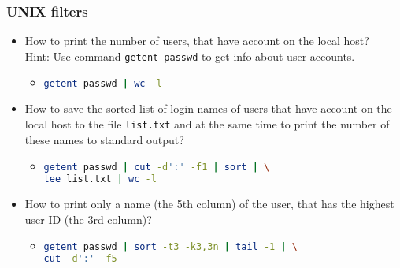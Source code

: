 \begin{frame}[fragile]
\frametitle{UNIX filters}
	\begin{itemize}
	
		\item How to print the number of users, that have account on the local host?\\
		
		Hint: Use command \texttt{getent passwd} to get info about user accounts.

			
		\begin{itemize}
			\item
\begin{lstlisting}[language=bash]		
getent passwd | wc -l
\end{lstlisting}
		\end{itemize}

		\item How to save the sorted list of login names of users that have account on the local host to the file \texttt{list.txt} 
			and at the same time to print the number of these names to standard output?
			
		\begin{itemize}
			\item
\begin{footnotesize}
\begin{lstlisting}[language=bash]		
getent passwd | cut -d':' -f1 | sort | \
tee list.txt | wc -l
\end{lstlisting}
\end{footnotesize}
		\end{itemize}

		\item How to print only a name (the 5th column) of the user, that has the highest user ID (the 3rd column)?
			
		\begin{itemize}
			\item
\begin{lstlisting}[language=bash]		
getent passwd | sort -t3 -k3,3n | tail -1 | \
cut -d':' -f5
\end{lstlisting}
		\end{itemize}
			
	\end{itemize}
\end{frame}

